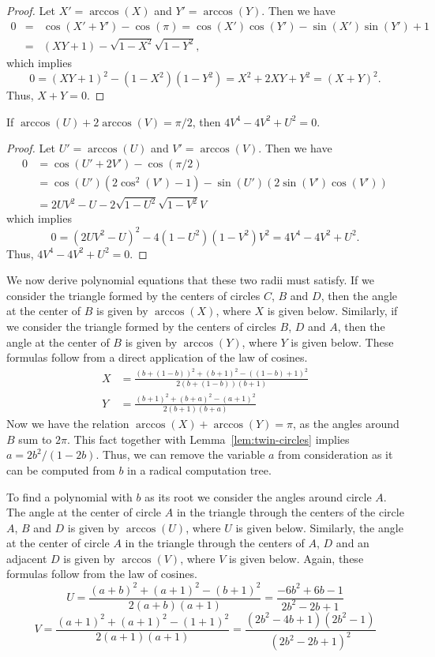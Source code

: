 \documentclass[oribibl,10pt]{llncs}
\begin{document}
\begin{appendix}
\begin{proof}
Let $X' = \arccos(X)$ and $Y' = \arccos(Y)$. Then we have
\begin{eqnarray*}
0 &=& \cos(X'+Y') - \cos(\pi) = \cos(X')\cos(Y')-\sin(X')\sin(Y') + 1 \\
  &=& (XY+1) - \sqrt{1-X^2}\sqrt{1-Y^2},
\end{eqnarray*}
which implies
\[
0 = (XY+1)^2 - (1-X^2)(1-Y^2) = X^2 + 2XY + Y^2 = (X+Y)^2.
\]
Thus, $X+Y = 0$.
\end{proof}

\begin{lemma}\label{lem:k5}
If $\arccos(U) + 2\arccos(V) = \pi/2$, then $4V^4 - 4V^2 + U^2 = 0$.
\end{lemma}

\begin{proof}
Let $U' = \arccos(U)$ and $V' = \arccos(V)$. Then we have
\begin{align*}
0 &= \cos(U' + 2V') - \cos(\pi/2)\\
&= \cos(U')(2\cos^2(V') - 1) - \sin(U')(2\sin(V')\cos(V'))\\
&= 2UV^2 - U - 2\sqrt{1-U^2}\sqrt{1-V^2}V
\end{align*}
which implies
\[
0 = (2UV^2 - U)^2 -4(1-U^2)(1-V^2)V^2 = 4V^4 - 4V^2 + U^2.
\]
Thus, $4V^4 - 4V^2 + U^2=0$.
\end{proof}

We now derive polynomial equations that these two radii must satisfy.
If we consider the triangle formed by the centers of circles $C$, $B$ and $D$, then the angle at the center of $B$ is given by $\arccos(X)$, where $X$ is given below. Similarly, if we consider the triangle formed by the centers of circles $B$, $D$ and $A$, then the angle at the center of $B$ is given by $\arccos(Y)$, where $Y$ is given below. These formulas follow from a direct application of the law of cosines.
\begin{align*}
X &= \frac{(b+(1-b))^2 + (b + 1)^2 - ((1-b)+1)^2}{2(b+(1-b))(b+1)}\\
Y &= \frac{(b+1)^2 + (b+a)^2 - (a+1)^2}{2(b+1)(b+a)}
\end{align*}
Now we have the relation $\arccos(X) + \arccos(Y) = \pi$, as the angles around $B$ sum to $2\pi$. This fact together with Lemma~\ref{lem:twin-circles} implies $a = 2b^2 / (1-2b)$. Thus, we can remove the variable $a$ from consideration as it can be computed from $b$ in a radical computation tree.

To find a polynomial with $b$ as its root we consider the angles around circle $A$. The angle at the center of circle $A$ in the triangle through the centers of the circle $A$, $B$ and $D$ is given by $\arccos(U)$, where $U$ is given below. Similarly, the angle at the center of circle $A$ in the triangle through the centers of $A$, $D$ and an adjacent $D$ is given by $\arccos(V)$, where $V$ is given below. Again, these formulas follow from the law of cosines.
\[
U = \frac{(a+b)^2 + (a+1)^2 - (b+1)^2}{2(a+b)(a+1)} = \frac{-6b^2 + 6b -1}{2b^2-2b+1}
\]
\[
V = \frac{(a+1)^2 + (a+1)^2 - (1+1)^2}{2 (a+1)(a+1)} = \frac{(2b^2 - 4b +1)(2b^2-1)}{(2b^2 - 2b +1)^2}
\]


\end{appendix}
\end{document}

